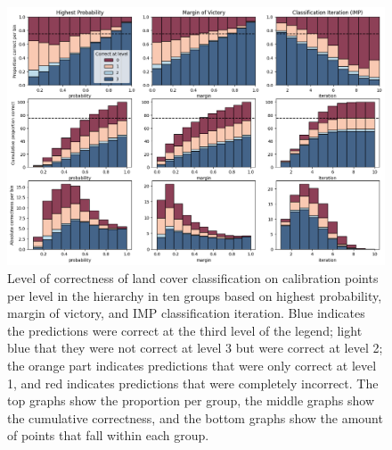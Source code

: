         \begin{figure}
            \centering
            \includegraphics[width=\linewidth]{figs_05/fig_calibration_calib.png}
            \caption{Level of correctness of land cover classification on calibration points per level in the hierarchy in ten groups based on highest probability, margin of victory, and IMP classification iteration. 
            Blue indicates the predictions were correct at the third level of the legend; light blue that they were not correct at level 3 but were correct at level 2; the orange part indicates predictions that were only correct at level 1, and red indicates predictions that were completely incorrect.
            The top graphs show the proportion per group, the middle graphs show the cumulative correctness, and the bottom graphs show the amount of points that fall within each group.}
            \label{fig:05_comparison_metrics_calib}
        \end{figure}

